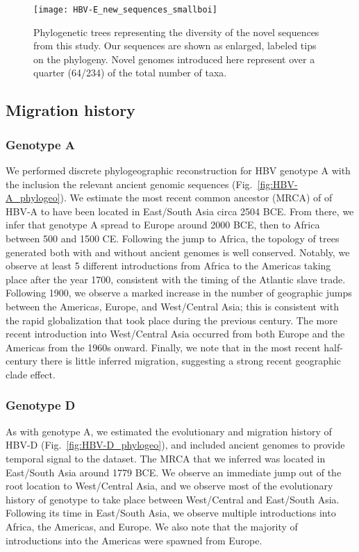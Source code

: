 \begin{figure}[ht]
  \centering
  \medskip
  \texttt{[image: HBV-E\_new\_sequences\_smallboi]}
  \caption[HBV-E New sequences]{Phylogenetic trees representing the diversity of the novel sequences from this study. Our sequences are shown as enlarged, labeled tips on the phylogeny. Novel genomes introduced here represent over a quarter (64/234) of the total number of taxa.}
  \label{fig:HBV-E_new_sequences}
\end{figure}

\subsection{Migration history}

\subsubsection{Genotype A}

We performed discrete phylogeographic reconstruction for HBV genotype A with the inclusion the relevant ancient genomic sequences (Fig.~\ref{fig:HBV-A_phylogeo}).
We estimate the most recent common ancestor (MRCA) of of HBV-A to have been located in East/South Asia circa 2504 BCE.
From there, we infer that genotype A spread to Europe around 2000 BCE, then to Africa between 500 and 1500 CE.
Following the jump to Africa, the topology of trees generated both with and without ancient genomes is well conserved.
Notably, we observe at least 5 different introductions from Africa to the Americas taking place after the year 1700, consistent with the timing of the Atlantic slave trade.
Following 1900, we observe a marked increase in the number of geographic jumps between the Americas, Europe, and West/Central Asia; this is consistent with the rapid globalization that took place during the previous century.
The more recent introduction into West/Central Asia occurred from both Europe and the Americas from the 1960s onward.
Finally, we note that in the most recent half-century there is little inferred migration, suggesting a strong recent geographic clade effect.

\subsubsection{Genotype D}

As with genotype A, we estimated the evolutionary and migration history of HBV-D (Fig.~\ref{fig:HBV-D_phylogeo}), and included ancient genomes to provide temporal signal to the dataset.
The MRCA that we inferred was located in East/South Asia around 1779 BCE.
We observe an immediate jump out of the root location to West/Central Asia, and we observe most of the evolutionary history of genotype to take place between West/Central and East/South Asia.
Following its time in East/South Asia, we observe multiple introductions into Africa, the Americas, and Europe.
We also note that the majority of introductions into the Americas were spawned from Europe.

